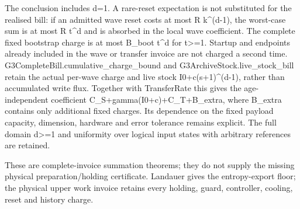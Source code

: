 \documentclass[
]{article}
\begin{document}
The conclusion includes d=1. A rare-reset expectation is not substituted
for the realised bill: if an admitted wave reset costs at most R
k\^{}(d-1), the worst-case sum is at most R t\^{}d and is absorbed in
the local wave coefficient. The complete fixed bootstrap charge is at
most B\_boot t\^{}d for t\textgreater=1. Startup and endpoints already
included in the wave or transfer invoice are not charged a second time.
G\allowbreak{}3\allowbreak{}C\allowbreak{}o\allowbreak{}m\allowbreak{}p\allowbreak{}l\allowbreak{}e\allowbreak{}t\allowbreak{}e\allowbreak{}B\allowbreak{}i\allowbreak{}l\allowbreak{}l\allowbreak{}.\allowbreak{}c\allowbreak{}u\allowbreak{}m\allowbreak{}u\allowbreak{}l\allowbreak{}a\allowbreak{}t\allowbreak{}i\allowbreak{}v\allowbreak{}e\allowbreak{}\_\allowbreak{}c\allowbreak{}h\allowbreak{}a\allowbreak{}r\allowbreak{}g\allowbreak{}e\allowbreak{}\_\allowbreak{}b\allowbreak{}o\allowbreak{}u\allowbreak{}n\allowbreak{}d
and
G\allowbreak{}3\allowbreak{}A\allowbreak{}r\allowbreak{}c\allowbreak{}h\allowbreak{}i\allowbreak{}v\allowbreak{}e\allowbreak{}S\allowbreak{}t\allowbreak{}o\allowbreak{}c\allowbreak{}k\allowbreak{}.\allowbreak{}l\allowbreak{}i\allowbreak{}v\allowbreak{}e\allowbreak{}\_\allowbreak{}s\allowbreak{}t\allowbreak{}o\allowbreak{}c\allowbreak{}k\allowbreak{}\_\allowbreak{}b\allowbreak{}i\allowbreak{}l\allowbreak{}l
retain the actual per-wave charge and live stock I0+c(s+1)\^{}(d-1),
rather than accumulated write flux. Together with TransferRate this
gives the age-independent coefficient
C\allowbreak{}\_\allowbreak{}S\allowbreak{}+\allowbreak{}g\allowbreak{}a\allowbreak{}m\allowbreak{}m\allowbreak{}a\allowbreak{}(\allowbreak{}I\allowbreak{}0\allowbreak{}+\allowbreak{}c\allowbreak{})\allowbreak{}+\allowbreak{}C\allowbreak{}\_\allowbreak{}T\allowbreak{}+\allowbreak{}B\allowbreak{}\_\allowbreak{}e\allowbreak{}x\allowbreak{}t\allowbreak{}r\allowbreak{}a\allowbreak{},
where B\_extra contains only additional fixed charges. Its dependence on
the fixed payload capacity, dimension, hardware and error tolerance
remains explicit. The full domain d\textgreater=1 and uniformity over
logical input states with arbitrary references are retained.

These are complete-invoice summation theorems; they do not supply the
missing physical
p\allowbreak{}r\allowbreak{}e\allowbreak{}p\allowbreak{}a\allowbreak{}r\allowbreak{}a\allowbreak{}t\allowbreak{}i\allowbreak{}o\allowbreak{}n\allowbreak{}/\allowbreak{}h\allowbreak{}o\allowbreak{}l\allowbreak{}d\allowbreak{}i\allowbreak{}n\allowbreak{}g
certificate. Landauer gives the entropy-export floor; the physical upper
work invoice retains every holding, guard, controller, cooling, reset
and history charge.
\end{document}
